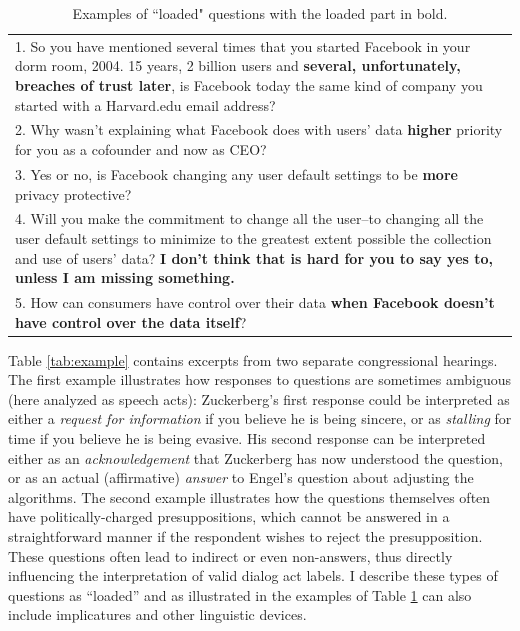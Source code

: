\begin{table}[t]
    \centering
    \begin{tabular}{p{11cm}}
    \toprule
1. So you have mentioned several times that you started Facebook in your dorm room, 2004. 15 years, 2 billion users and \textbf{several, unfortunately, breaches of trust later}, is Facebook today the same kind of company you started with a Harvard.edu email address?\\
2. Why wasn't explaining what Facebook does with users' data \textbf{higher} priority for you as a cofounder and now as CEO? \\
3. Yes or no, is Facebook changing any user default settings to be \textbf{more} privacy protective? \\
4. Will you make the commitment to change all the user--to changing all the user default settings to minimize to the greatest extent possible the collection and use of users' data? \textbf{I don't think that is hard for you to say yes to, unless I am missing something.}\\
5. How can consumers have control over their data \textbf{when Facebook doesn't have control over the data itself}?\\
    \bottomrule
    \end{tabular}
    \caption{Examples of ``loaded" questions with the loaded part in bold.}
    \label{tab:example_loaded}
\end{table}

Table \ref{tab:example} contains excerpts from two separate congressional hearings. The first example illustrates how responses to questions are sometimes ambiguous (here analyzed as speech acts): Zuckerberg's first response could be interpreted as either a \emph{request for information} if you believe he is being sincere, or as \emph{stalling} for time if you believe he is being evasive. His second response can be interpreted either as an \emph{acknowledgement} that Zuckerberg has now understood the question, or as an actual (affirmative) \emph{answer} to Engel's question about adjusting the algorithms. The second example illustrates how the questions themselves often have politically-charged presuppositions, which cannot be answered in a straightforward manner if the respondent wishes to reject the presupposition. These questions often lead to indirect or even non-answers, thus directly influencing the interpretation of valid dialog act labels. I describe these types of questions as ``loaded'' and as illustrated in the examples of Table \ref{tab:example_loaded} can also include implicatures and other linguistic devices. 

